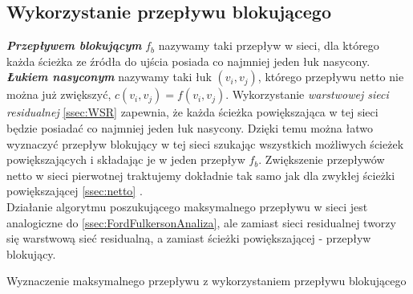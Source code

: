 \subsection{Wykorzystanie przepływu blokującego}\label{ssec:blockingFlowAnaliza}
\textbf{\textit{Przepływem blokującym}} $ f_b $ nazywamy taki przepływ w sieci, dla którego każda ścieżka ze źródła do ujścia posiada co najmniej jeden łuk nasycony. \textbf{\textit{Łukiem nasyconym}} nazywamy taki łuk $ (v_i,v_j) $, którego przepływu netto nie można już zwiększyć, $ c(v_i,v_j)=f(v_i,v_j) $. Wykorzystanie \textit{warstwowej sieci residualnej} \ref{ssec:WSR} zapewnia, że każda ścieżka powiększająca w tej sieci będzie posiadać co najmniej jeden łuk nasycony. Dzięki temu można łatwo wyznaczyć przepływ blokujący w tej sieci szukając wszystkich możliwych ścieżek powiększających i składając je w jeden przepływ $ f_b $. Zwiększenie przepływów netto w sieci pierwotnej traktujemy dokładnie tak samo jak dla zwykłej ścieżki powiększającej \ref{ssec:netto} \cite{id:ZaawansowaneAlgorytmy}.\\\indent
Działanie algorytmu poszukującego maksymalnego przepływu w sieci jest analogiczne do  \ref{ssec:FordFulkersonAnaliza}, ale zamiast sieci residualnej tworzy się warstwową sieć residualną, a zamiast ścieżki powiększającej - przepływ blokujący.
\begin{algorithm}[H]
	\caption{Wyznaczenie maksymalnego przepływu z wykorzystaniem przepływu blokującego} \label{blockingFlowPseudo}
	\begin{algorithmic}
		\EndWhile\space{}
		\EndProcedure
	\end{algorithmic}
\end{algorithm}
